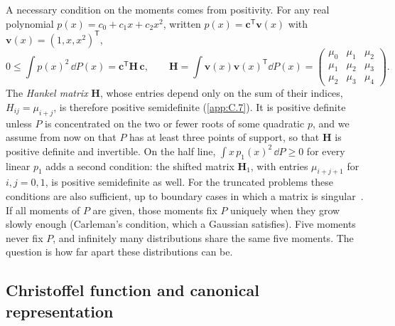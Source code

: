 A necessary condition on the moments comes from positivity. For any real polynomial $p(x) = c_0 + c_1x + c_2x^2$, written $p(x) = \mathbf{c}^{\mathsf{T}}\mathbf{v}(x)$ with $\mathbf{v}(x) = (1, x, x^2)^{\mathsf{T}}$,
\begin{equation}
  0 \le \int p(x)^2\,\dd P(x) = \mathbf{c}^{\mathsf{T}}\mathbf{H}\,\mathbf{c}, \qquad
  \mathbf{H} = \int\mathbf{v}(x)\mathbf{v}(x)^{\mathsf{T}}\dd P(x) = \begin{pmatrix} \mu_0 & \mu_1 & \mu_2\\ \mu_1 & \mu_2 & \mu_3\\ \mu_2 & \mu_3 & \mu_4 \end{pmatrix} .
  \label{eq:C.10-hankel}
\end{equation}
The \emph{Hankel matrix} $\mathbf{H}$, whose entries depend only on the sum of their indices, $H_{ij} = \mu_{i+j}$, is therefore positive semidefinite (\cref{app:C.7}). It is positive definite unless $P$ is concentrated on the two or fewer roots of some quadratic $p$, and we assume from now on that $P$ has at least three points of support, so that $\mathbf{H}$ is positive definite and invertible. On the half line, $\int x\,p_1(x)^2\,\dd P \ge 0$ for every linear $p_1$ adds a second condition: the shifted matrix $\mathbf{H}_1$, with entries $\mu_{i+j+1}$ for $i, j = 0, 1$, is positive semidefinite as well. For the truncated problems these conditions are also sufficient, up to boundary cases in which a matrix is singular~\cite{krein1977markov}. If all moments of $P$ are given, those moments fix $P$ uniquely when they grow slowly enough (Carleman's condition, which a Gaussian satisfies). Five moments never fix $P$, and infinitely many distributions share the same five moments. The question is how far apart these distributions can be.

\subsection{Christoffel function and canonical representation}

